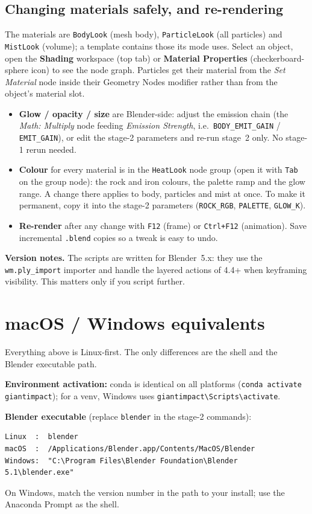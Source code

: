 \documentclass[11pt]{article}
\newcommand{\pc}[1]{\texttt{#1}}
\begin{document}
\subsection{Changing materials safely, and re-rendering}
The materials are \pc{BodyLook} (mesh body), \pc{ParticleLook} (all particles) and \pc{MistLook} (volume); a template contains those its mode uses. Select an object, open the
\textbf{Shading} workspace (top tab) or \textbf{Material Properties}
(checkerboard-sphere icon) to see the node graph. Particles get their material from the \emph{Set Material} node inside their Geometry Nodes modifier rather than from the object's material slot.
\begin{itemize}
  \item \textbf{Glow / opacity / size} are Blender-side: adjust the emission
        chain (the \emph{Math: Multiply} node feeding \emph{Emission Strength},
        i.e.\ \pc{BODY\_EMIT\_GAIN} / \pc{EMIT\_GAIN}), or edit the stage-2
        parameters and re-run stage~2 only. No stage-1 rerun needed.
  \item \textbf{Colour} for every material is in the \pc{HeatLook} node group
        (open it with \pc{Tab} on the group node): the rock and iron colours, the
        palette ramp and the glow range. A change there applies to body,
        particles and mist at once. To make it permanent, copy it into the
        stage-2 parameters (\pc{ROCK\_RGB}, \pc{PALETTE}, \pc{GLOW\_K}).
  \item \textbf{Re-render} after any change with \pc{F12} (frame) or
        \pc{Ctrl+F12} (animation). Save incremental \pc{.blend} copies so a
        tweak is easy to undo.
\end{itemize}
 
\noindent\textbf{Version notes.} The scripts are written for Blender~5.x: they use the \pc{wm.ply\_import} importer and handle the layered actions of 4.4+ when keyframing visibility. This matters only if you script further.
 
\appendix
\section{macOS / Windows equivalents}
Everything above is Linux-first. The only differences are the shell and the
Blender executable path.
 
\textbf{Environment activation:} conda is identical on all platforms
(\pc{conda activate giantimpact}); for a venv, Windows uses
\pc{giantimpact\textbackslash Scripts\textbackslash activate}.
 
\textbf{Blender executable} (replace \pc{blender} in the stage-2 commands):
\begin{verbatim}
Linux  :  blender
macOS  :  /Applications/Blender.app/Contents/MacOS/Blender
Windows:  "C:\Program Files\Blender Foundation\Blender 5.1\blender.exe"
\end{verbatim}
On Windows, match the version number in the path to your install; use the
Anaconda Prompt as the shell.
 
\end{document}
